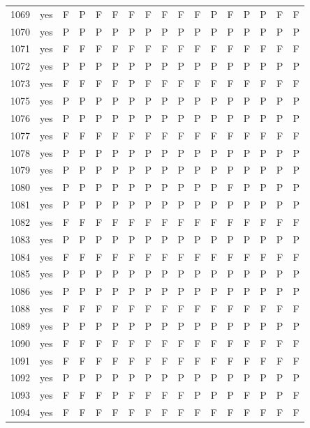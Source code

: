 \begin{table}[p]
\begin{tabular*}{\textwidth}{@{\extracolsep{\fill}}rcccccccccccccccc}
1069 & yes & F & P & F & F & F & F & F & F & F & P & F & P & P & F & F\\
1070 & yes & P & P & P & P & P & P & P & P & P & P & P & P & P & P & P\\
1071 & yes & F & F & F & F & F & F & F & F & F & F & F & F & F & F & F\\
1072 & yes & P & P & P & P & P & P & P & P & P & P & P & P & P & P & P\\
1073 & yes & F & F & F & F & P & F & F & F & F & F & F & F & F & F & F\\
1075 & yes & P & P & P & P & P & P & P & P & P & P & P & P & P & P & P\\
1076 & yes & P & P & P & P & P & P & P & P & P & P & P & P & P & P & P\\
1077 & yes & F & F & F & F & F & F & F & F & F & F & F & F & F & F & F\\
1078 & yes & P & P & P & P & P & P & P & P & P & P & P & P & P & P & P\\
1079 & yes & P & P & P & P & P & P & P & P & P & P & P & P & P & P & P\\
1080 & yes & P & P & P & P & P & P & P & P & P & P & F & P & P & P & P\\
1081 & yes & P & P & P & P & P & P & P & P & P & P & P & P & P & P & P\\
1082 & yes & F & F & F & F & F & F & F & F & F & F & F & F & F & F & F\\
1083 & yes & P & P & P & P & P & P & P & P & P & P & P & P & P & P & P\\
1084 & yes & F & F & F & F & F & F & F & F & F & F & F & F & F & F & F\\
1085 & yes & P & P & P & P & P & P & P & P & P & P & P & P & P & P & P\\
1086 & yes & P & P & P & P & P & P & P & P & P & P & P & P & P & P & P\\
1088 & yes & F & F & F & F & F & F & F & F & F & F & F & F & F & F & F\\
1089 & yes & P & P & P & P & P & P & P & P & P & P & P & P & P & P & P\\
1090 & yes & F & F & F & F & F & F & F & F & F & F & F & F & F & F & F\\
1091 & yes & F & F & F & F & F & F & F & F & F & F & F & F & F & F & F\\
1092 & yes & P & P & P & P & P & P & P & P & P & P & P & P & P & P & P\\
1093 & yes & F & F & F & P & F & F & F & F & P & P & P & F & P & P & F\\
1094 & yes & F & F & F & F & F & F & F & F & F & F & F & F & F & F & F\\
\bottomrule\end{tabular*}\end{table}
\clearpage

